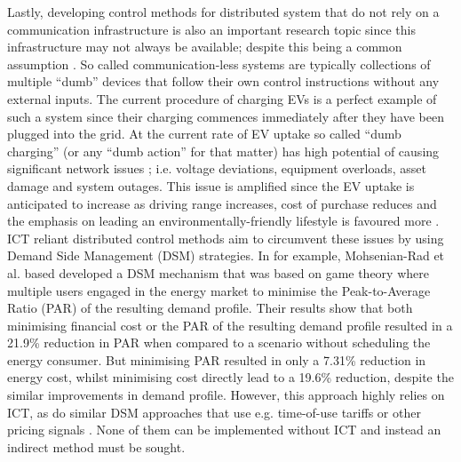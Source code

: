 Lastly, developing control methods for distributed system that do not rely on a communication infrastructure is also an important research topic since this infrastructure may not always be available; despite this being a common assumption \cite{Hatziargyriou2015}.
So called communication-less systems are typically collections of multiple ``dumb'' devices that follow their own control instructions without any external inputs.
The current procedure of charging EVs is a perfect example of such a system since their charging commences immediately after they have been plugged into the grid.
At the current rate of EV uptake so called ``dumb charging'' (or any ``dumb action'' for that matter) has high potential of causing significant network issues \cite{Hota2014, Liu2015a}; i.e. voltage deviations, equipment overloads, asset damage and system outages.
This issue is amplified since the EV uptake is anticipated to increase as driving range increases, cost of purchase reduces and the emphasis on leading an environmentally-friendly lifestyle is favoured more \cite{Shah2015}.
ICT reliant distributed control methods aim to circumvent these issues by using Demand Side Management (DSM) strategies.
In \cite{Mohsenian-Rad2010} for example, Mohsenian-Rad et al. based developed a DSM mechanism that was based on game theory where multiple users engaged in the energy market to minimise the Peak-to-Average Ratio (PAR) of the resulting demand profile.
Their results show that both minimising financial cost or the PAR of the resulting demand profile resulted in a 21.9\% reduction in PAR when compared to a scenario without scheduling the energy consumer.
But minimising PAR resulted in only a 7.31\% reduction in energy cost, whilst minimising cost directly lead to a 19.6\% reduction, despite the similar improvements in demand profile.
However, this approach highly relies on ICT, as do similar DSM approaches that use e.g. time-of-use tariffs \cite{Deilami2011, Surles2012} or other pricing signals \cite{Masoum2015}.
None of them can be implemented without ICT and instead an indirect method must be sought.


